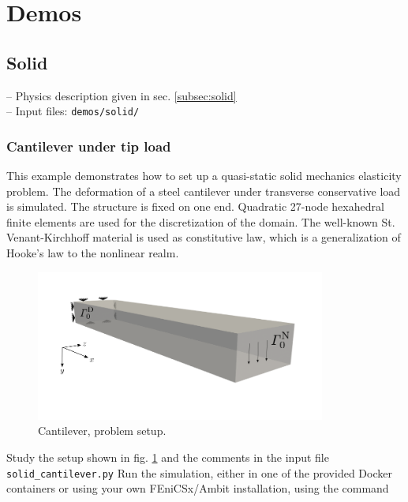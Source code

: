 \documentclass[a4paper,12pt]{report}
\begin{document}
\section{Demos}\label{sec:demos}

\subsection{Solid}\label{subsec:demos:solid}

-- Physics description given in sec. \ref{subsec:solid}\\

-- Input files: \verb"demos/solid/"

\subsubsection*{Cantilever under tip load}

This example demonstrates how to set up a quasi-static solid mechanics elasticity problem. The deformation of a steel cantilever under transverse conservative load is simulated. The structure is fixed on one end. Quadratic 27-node hexahedral finite elements are used for the discretization of the domain. The well-known St. Venant-Kirchhoff material is used as constitutive law, which is a generalization of Hooke's law to the nonlinear realm.\\

\begin{figure}
\centering
\includegraphics[width=0.85\textwidth]{fig/cantilever_setup.png}
\caption{Cantilever, problem setup.}
\label{fig:cantilever_setup}
\end{figure}

Study the setup shown in fig. \ref{fig:cantilever_setup} and the comments in the input file \verb"solid_cantilever.py" Run the simulation, either in one of the provided Docker containers or using your own FEniCSx/Ambit installation, using the command
\end{document}
